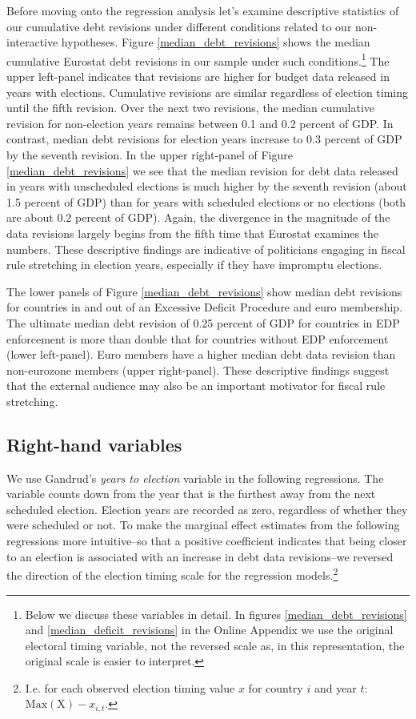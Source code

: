 \documentclass[]{article}
\begin{document}
Before moving onto the regression analysis let's examine descriptive statistics of our cumulative debt revisions under different conditions related to our non-interactive hypotheses. Figure \ref{median_debt_revisions} shows the median cumulative Eurostat debt revisions in our sample under such conditions.\footnote{Below we discuss these variables in detail. In figures \ref{median_debt_revisions} and \ref{median_deficit_revisions} in the Online Appendix we use the original electoral timing variable, not the reversed scale as, in this representation, the original scale is easier to interpret.} The upper left-panel indicates that revisions are higher for budget data released in years with elections. Cumulative revisions are similar regardless of election timing until the fifth revision. Over the next two revisions, the median cumulative revision for non-election years remains between 0.1 and 0.2 percent of GDP. In contrast, median debt revisions for election years increase to 0.3 percent of GDP by the seventh revision. In the upper right-panel of Figure \ref{median_debt_revisions} we see that the median revision for debt data released in years with unscheduled elections is much higher by the seventh revision (about 1.5 percent of GDP) than for years with scheduled elections or no elections (both are about 0.2 percent of GDP). Again, the divergence in the magnitude of the data revisions largely begins from the fifth time that Eurostat examines the numbers. These descriptive findings are indicative of politicians engaging in fiscal rule stretching in election years, especially if they have impromptu elections.

The lower panels of Figure \ref{median_debt_revisions} show median debt revisions for countries in and out of an Excessive Deficit Procedure and euro membership. The ultimate median debt revision of 0.25 percent of GDP for countries in EDP enforcement is more than double that for countries without EDP enforcement (lower left-panel). Euro members have a higher median debt data revision than non-eurozone members (upper right-panel). These descriptive findings suggest that the external audience may also be an important motivator for fiscal rule stretching.

\subsection{Right-hand variables}

We use Gandrud's \citeyearpar{gandrudYrcurnt} \emph{years to election} variable in the following regressions. The variable counts down from the year that is the furthest away from the next scheduled election. Election years are recorded as zero, regardless of whether they were scheduled or not. To make the marginal effect estimates from the following regressions more intuitive--so that a positive coefficient indicates that being closer to an election is associated with an increase in debt data revisions--we reversed the direction of the election timing scale for the regression models.\footnote{I.e. for each observed election timing value $x$ for country $i$ and year $t$: $\mathrm{Max}(\mathrm{X}) - x_{i,t}$.}
\end{document}
